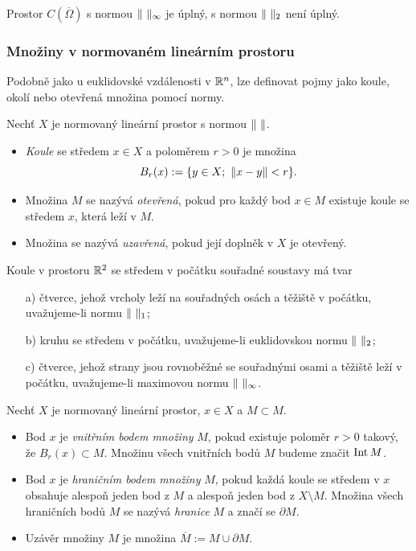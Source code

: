 \begin{veta}
Prostor $C(\overline\Omega)$ s normou $\norm{\ }_\infty$ je úplný, s normou $\norm{\ }_2$ není úplný.
\end{veta}



\subsubsection{Množiny v normovaném lineárním prostoru}
% 
Podobně jako u euklidovské vzdálenosti v $\mathbb R^n$, lze definovat pojmy jako koule, okolí nebo otevřená množina pomocí normy.
\begin{df}
Nechť $X$ je normovaný lineární prostor s normou $\|\ \|$.
\begin{itemize}
\item \emph{Koule} se středem $x\in X$ a poloměrem $r>0$ je množina
\[ B_r(x) := \{y\in X;~\|x-y\|<r\}. \]
\item Množina $M$ se nazývá \emph{otevřená}, pokud pro každý bod $x\in M$ existuje koule se středem $x$, která leží v $M$.
\item Množina se nazývá \emph{uzavřená}, pokud její doplněk v $X$ je otevřený.
\end{itemize}
\end{df}

\begin{ex}
Koule v prostoru $\mathbb R^2$ se středem v počátku souřadné soustavy má tvar
\begin{itemize}
\item[a)] čtverce, jehož vrcholy leží na souřadných osách a těžiště v počátku, uvažujeme-li normu $\|\ \|_1$;
\item[b)] kruhu se středem v počátku, uvažujeme-li euklidovskou normu $\norm{\ }_2$;
\item[c)] čtverce, jehož strany jsou rovnoběžné se souřadnými osami a těžiště leží v počátku, uvažujeme-li maximovou normu $\norm{\ }_\infty$.
\end{itemize}
\end{ex}

\begin{df}
Nechť $X$ je normovaný lineární prostor, $x\in X$ a $M\subset M$.
\begin{itemize}
\item Bod $x$ je \emph{vnitřním bodem množiny} $M$, pokud existuje poloměr $r>0$ takový, že $B_r(x)\subset M$.
Množinu všech vnitřních bodů $M$ budeme značit $\operatorname{Int} M$.
\item Bod $x$ je \emph{hraničním bodem množiny} $M$, pokud každá koule se středem v $x$ obsahuje alespoň jeden bod z $M$ a alespoň jeden bod z $X\setminus M$.
Množina všech hraničních bodů $M$ se nazývá \emph{hranice} $M$ a značí se $\partial M$.
\item Uzávěr množiny $M$ je množina $\overline M:=M\cup\partial M$.
\end{itemize}
\end{df}

